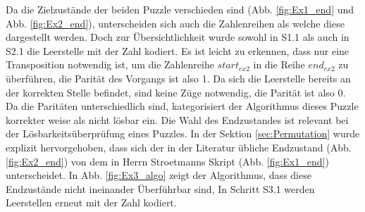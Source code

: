 Da die Zielzustände der beiden Puzzle verschieden sind (Abb. \ref{fig:Ex1_end} und Abb. \ref{fig:Ex2_end}), unterscheiden sich auch die Zahlenreihen als welche diese dargestellt werden. Doch zur Übersichtlichkeit wurde sowohl in S1.1 als auch in S2.1 die Leerstelle mit der Zahl  kodiert. Es ist leicht zu erkennen, dass nur eine Transposition notwendig ist, um die Zahlenreihe $start_{ex2}$ in die Reihe $end_{ex2}$ zu überführen, die Parität des Vorgangs ist also 1. Da sich die Leerstelle bereits an der korrekten Stelle befindet, sind keine Züge notwendig, die Parität ist also 0. Da die Paritäten unterschiedlich sind, kategorisiert der Algorithmus dieses Puzzle korrekter weise als  nicht lösbar ein.\WNL
%
%
Die Wahl des Endzustandes ist relevant bei der Lösbarkeitsüberprüfung eines Puzzles. In der Sektion \ref{sec:Permutation} wurde explizit hervorgehoben, dass sich der in der Literatur übliche Endzustand (Abb. \ref{fig:Ex2_end}) von dem in Herrn Stroetmanns Skript \autocite{github-stroetmann:online} (Abb. \ref{fig:Ex1_end}) unterscheidet. In Abb. \ref{fig:Ex3_algo} zeigt der Algorithmus, dass diese Endzustände nicht ineinander Überführbar sind, In Schritt S3.1 werden Leerstellen erneut mit der Zahl  kodiert.
